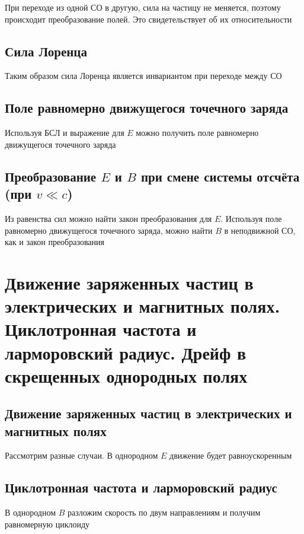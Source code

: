 \documentclass[a4paper, 14pt]{article}
\begin{document}
    При переходе из одной СО в другую, сила на частицу не меняется, поэтому происходит преобразование полей.
    Это свидетельствует об их относительности
    
    \subsection{Сила Лоренца}
    
    Таким образом сила Лоренца является инвариантом при переходе между СО
    
    \subsection{Поле равномерно движущегося точечного заряда}
    
    Используя БСЛ и выражение для $E$ можно получить поле равномерно движущегося точечного заряда
    
    \subsection{Преобразование $E$ и $B$ при смене системы отсчёта (при $v \ll c$)}
    
    Из равенства сил можно найти закон преобразования для $E$.
    Используя поле равномерно движущегося точечного заряда, можно найти $B$ в неподвижной СО, как и закон преобразования
    
    \section{Движение заряженных частиц в электрических и магнитных полях.
    Циклотронная частота и ларморовский радиус.
    Дрейф в скрещенных однородных полях}
    
    \subsection{Движение заряженных частиц в электрических и магнитных полях}
    
    Рассмотрим разные случаи.
    В однородном $E$ движение будет равноускоренным
    
    \subsection{Циклотронная частота и ларморовский радиус}
    
    В однородном $B$ разложим скорость по двум направлениям и получим равномерную циклоиду
    
\end{document}
